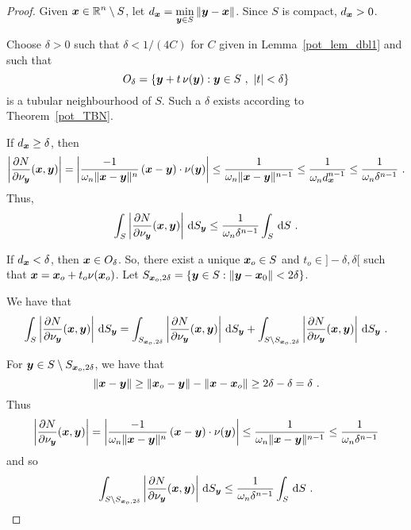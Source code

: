 \begin{proof}
Given $\displaystyle {\bm{x}} \in \mathbb{R}^n\setminus S$, let
$\displaystyle d_{{\bm{x}}} = \min_{{\bm{y}} \in S}\|{\bm{y}} - {\bm{x}}\|$.
Since $S$ is compact, $\displaystyle d_{{\bm{x}}} >0$.

Choose $\delta >0$ such that $\delta < 1/(4C)$ for $C$ given in
Lemma~\ref{pot_lem_dbl1} and such that
\[
O_{\delta} = \left\{ {\bm{y}} + t\, \nu({\bm{y}}) : {\bm{y}} \in S \ ,
\ |t|<\delta \right\}
\]
is a tubular neighbourhood of $S$.  Such a $\delta$ exists according
to Theorem~\ref{pot_TBN}.

 If $\displaystyle d_{{\bm{x}}} \geq \delta$, then
\[
\left| \frac{\partial{N}}{\partial \nu_{{\bm{y}}}}({\bm{x}},{\bm{y}})\right| 
= \left| \frac{-1}{\omega_n \|{\bm{x}}-{\bm{y}}\|^n}\,({\bm{x}}-{\bm{y}})
\cdot \nu({\bm{y}}) \right|
\leq \frac{1}{\omega_n \|{\bm{x}}-{\bm{y}}\|^{n-1}}
\leq \frac{1}{\omega_n d_{{\bm{x}}}^{n-1}}
\leq \frac{1}{\omega_n \delta^{n-1}} \ .
\]
Thus,
\begin{equation} \label{Bounddny1}
\int_S \left| \pdydx{N}{\nu_{\VEC{y}}}(\VEC{x},\VEC{y})
\right| \dss{S}{y} \leq \frac{1}{\omega_n \delta^{n-1}} \int_S \dx{S} \ .
\end{equation}

  If $\displaystyle d_{{\bm{x}}} < \delta$, then
${\bm{x}} \in O_{\delta}$.  So, there exist a unique
${\bm{x}}_o \in S$ and $t_o \in ]-\delta,\delta[$ such
that
$\displaystyle {\bm{x}} = {\bm{x}}_o + t_o\nu({\bm{x}}_o)$.
Let $\displaystyle S_{{\bm{x}}_o,2\delta} = 
\left\{ {\bm{y}} \in S : \|{\bm{y}} - {\bm{x}}_0\| < 2\delta \right\}$.

We have that
\[
\int_S \left| \frac{\partial{N}}{\partial \nu_{{\bm{y}}}}({\bm{x}},{\bm{y}}) \right|
\,\mathrm{d}{S}_{{\bm{y}}}
= \int_{S_{{\bm{x}}_o,2\delta}}
\left| \frac{\partial{N}}{\partial \nu_{{\bm{y}}}}({\bm{x}},{\bm{y}}) \right| \,\mathrm{d}{S}_{{\bm{y}}}
+ \int_{S\setminus S_{{\bm{x}}_o,2\delta}}
\left| \frac{\partial{N}}{\partial \nu_{{\bm{y}}}}({\bm{x}},{\bm{y}}) \right|
\,\mathrm{d}{S}_{{\bm{y}}} \ .
\]

For ${\bm{y}} \in S \setminus S_{{\bm{x}}_o,2\delta}$, we have that
\[
\|{\bm{x}} - {\bm{y}} \|
\geq \|{\bm{x}}_o-{\bm{y}}\| - \|{\bm{x}}-{\bm{x}}_o\|
\geq 2\delta - \delta = \delta \ .
\]
Thus
\[
\left| \frac{\partial{N}}{\partial \nu_{{\bm{y}}}}({\bm{x}},{\bm{y}})\right| 
= \left| \frac{-1}{\omega_n \|{\bm{x}}-{\bm{y}}\|^n}\,({\bm{x}}-{\bm{y}})
\cdot \nu({\bm{y}}) \right|
\leq \frac{1}{\omega_n \|{\bm{x}}-{\bm{y}}\|^{n-1}}
\leq \frac{1}{\omega_n \delta^{n-1}}
\]
and so
\begin{equation}  \label{Bounddny2}
\int_{S\setminus S_{{\bm{x}}_o,2\delta}}
\left| \frac{\partial{N}}{\partial \nu_{{\bm{y}}}}({\bm{x}},{\bm{y}}) \right| \,\mathrm{d}{S}_{{\bm{y}}}
\leq \frac{1}{\omega_n \delta^{n-1}} \int_S \,\mathrm{d}{S} \ .
\end{equation}


\end{proof}
